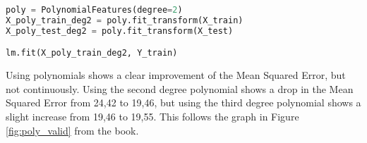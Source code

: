 \begin{lstlisting}[language=Python, label=lst:poly2_valid, caption=Polynomial features with degree = 2]
poly = PolynomialFeatures(degree=2)
X_poly_train_deg2 = poly.fit_transform(X_train)
X_poly_test_deg2 = poly.fit_transform(X_test)

lm.fit(X_poly_train_deg2, Y_train)
\end{lstlisting}








Using polynomials shows a clear improvement of the Mean Squared Error, but not continuously. Using the second degree polynomial shows a drop in the Mean Squared Error from 24,42 to 19,46, but using the third degree polynomial shows a slight increase from 19,46 to 19,55. This follows the graph in Figure \ref{fig:poly_valid} from the book. 

 


